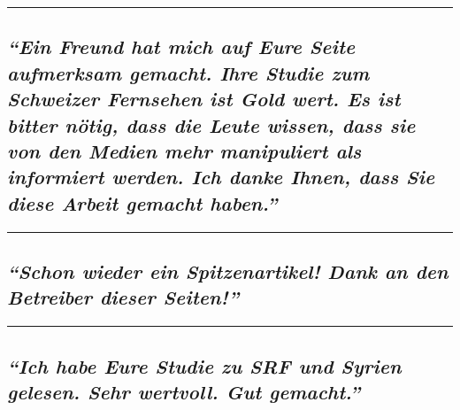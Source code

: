 \begin{center}\rule{0.5\linewidth}{\linethickness}\end{center}

\hypertarget{ein-freund-hat-mich-auf-eure-seite-aufmerksam-gemacht-ihre-studie-zum-schweizer-fernsehen-ist-gold-wert-es-ist-bitter-nuxf6tig-dass-die-leute-wissen-dass-sie-von-den-medien-mehr-manipuliert-als-informiert-werden-ich-danke-ihnen-dass-sie-diese-arbeit-gemacht-haben}{%
\subsection{\texorpdfstring{\emph{``Ein Freund hat mich auf Eure Seite
aufmerksam gemacht. Ihre Studie zum Schweizer Fernsehen ist Gold wert.
Es ist bitter nötig, dass die Leute wissen, dass sie von den Medien mehr
manipuliert als informiert werden. Ich danke Ihnen, dass Sie diese
Arbeit gemacht
haben.''}}{``Ein Freund hat mich auf Eure Seite aufmerksam gemacht. Ihre Studie zum Schweizer Fernsehen ist Gold wert. Es ist bitter nötig, dass die Leute wissen, dass sie von den Medien mehr manipuliert als informiert werden. Ich danke Ihnen, dass Sie diese Arbeit gemacht haben.''}}\label{ein-freund-hat-mich-auf-eure-seite-aufmerksam-gemacht-ihre-studie-zum-schweizer-fernsehen-ist-gold-wert-es-ist-bitter-nuxf6tig-dass-die-leute-wissen-dass-sie-von-den-medien-mehr-manipuliert-als-informiert-werden-ich-danke-ihnen-dass-sie-diese-arbeit-gemacht-haben}}

\begin{center}\rule{0.5\linewidth}{\linethickness}\end{center}

\hypertarget{schon-wieder-ein-spitzenartikel-dank-an-den-betreiber-dieser-seiten}{%
\subsection{\texorpdfstring{\emph{``Schon wieder ein Spitzenartikel!
Dank an den Betreiber dieser
Seiten!''}}{``Schon wieder ein Spitzenartikel! Dank an den Betreiber dieser Seiten!''}}\label{schon-wieder-ein-spitzenartikel-dank-an-den-betreiber-dieser-seiten}}

\begin{center}\rule{0.5\linewidth}{\linethickness}\end{center}

\hypertarget{ich-habe-eure-studie-zu-srf-und-syrien-gelesen-sehr-wertvoll-gut-gemacht}{%
\subsection{\texorpdfstring{\emph{``Ich habe Eure Studie zu SRF und
Syrien gelesen. Sehr wertvoll. Gut
gemacht.''}}{``Ich habe Eure Studie zu SRF und Syrien gelesen. Sehr wertvoll. Gut gemacht.''}}\label{ich-habe-eure-studie-zu-srf-und-syrien-gelesen-sehr-wertvoll-gut-gemacht}}

